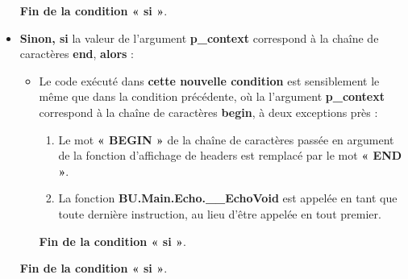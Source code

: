 \documentclass[a4paper,10pt]{article}
\begin{document}
\begin{itemize}
{\begin{itemize}
{                    \begin{justify}
                        \textbf{\color{cond}Fin de la condition « si »}.
                    \end{justify}
                }
            \end{itemize}
        }

        \item
        {
            \setlength{\parskip}{2em}

            \begin{justify}
                \textbf{\color{cond}Sinon, si} la valeur de l'argument \textbf{\color{vars}p\_context} correspond à la chaîne de caractères \textbf{end}, \textbf{\color{cond}alors} :
            \end{justify}

            \setlength{\parskip}{1em}

            \begin{itemize}
                \item
                {
                    \begin{justify}
                        Le code exécuté dans \textbf{\color{cond}cette nouvelle condition} est sensiblement le même que dans la condition précédente, où la l'argument \textbf{\color{vars}p\_context} correspond à la chaîne de caractères \textbf{begin}, à deux exceptions près :

                        \begin{enumerate}
                            \item Le mot \textbf{« BEGIN »} de la chaîne de caractères passée en argument de la fonction d'affichage de headers est remplacé par le mot \textbf{« END »}.

                            \item La fonction \textbf{\color{func}BU.Main.Echo.\_\_EchoVoid} est appelée en tant que toute dernière instruction, au lieu d'être appelée en tout premier.
                        \end{enumerate}
                    \end{justify}\setlength{\parskip}{1em}

                    \begin{justify}
                        \textbf{\color{cond}Fin de la condition « si »}.
                    \end{justify}
                }
            \end{itemize}

            \begin{justify}
                \textbf{\color{cond}Fin de la condition « si »}.
            \end{justify}
        }
    \end{itemize}
\end{document}
